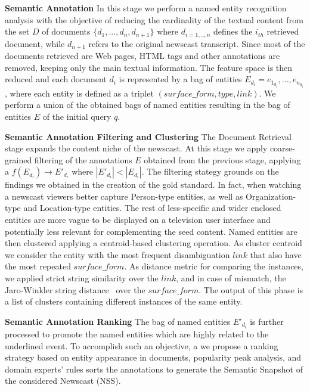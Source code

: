 \documentclass{llncs}
\begin{document}
{\bf Semantic Annotation} In this stage we perform a named entity recognition analysis with the objective of reducing the cardinality of the textual content from the set $D$ of documents $\{d_1, ..., d_n, d_{n+1}\}$ where $d_{i=1,..,n}$ defines the $i_{th}$ retrieved document, while $d_{n+1}$ refers to the original newscast transcript. Since most of the documents retrieved are Web pages, HTML tags and other annotations are removed, keeping only the main textual information. The feature space is then reduced and each document $d_i$ is represented by a bag of entities $E_{d_i}={e_{1_{d_i}}, ..., e_{n_{d_i}}}$, where each entity is defined as a triplet $(surface\_form, type, link)$. We perform a union of the obtained bags of named entities resulting in the bag of entities $E$ of the initial query $q$. 

{\bf Semantic Annotation Filtering and Clustering} The Document Retrieval stage expands the content niche of the newscast. At this stage we apply coarse-grained filtering of the annotations $E$ obtained from the previous stage, applying a $f\left ( E_{d_i}\right )\rightarrow  E'_{d_i}$ where $\left |E'_{d_i}  \right | < \left |E_{d_i}  \right |$. The filtering stategy grounds on the findings we obtained in the creation of the gold standard. In fact, when watching a newscast viewers better capture Person-type entities, as well as Organization-type and Location-type entities. The rest of less-specific and wider enclosed entities are more vague to be displayed on a television user interface and potentially less relevant for complementing the seed content. 
Named entities are then clustered applying a centroid-based clustering operation. As cluster centroid we consider the entity with the most frequent disambiguation $link$ that also have the most repeated $surface\_form$. As distance metric for comparing the instances, we applied strict string similarity over the $link$, and in case of mismatch, the Jaro-Winkler string distance~\cite{winkler2006overview} over the $surface\_form$. The output of this phase is a list of clusters containing different instances of the same entity.

{\bf Semantic Annotation Ranking}
The bag of named entities $E'_{d_i}$ is further processed to promote the named entities which are highly related to the underlined event. To accomplish such an objective, a we propose a ranking strategy based on entity appearance in documents, popularity peak analysis, and domain experts' rules sorts the annotations to generate the Semantic Snapshot of the considered Newscast (NSS).
\end{document}
